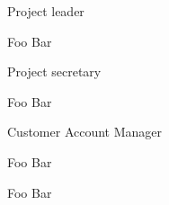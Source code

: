 \begin{itemize*}
	\item Project leader
	\begin{itemize*}
		\item Foo Bar
	\end{itemize*}

	\item Project secretary
	\begin{itemize*}
		\item Foo Bar
	\end{itemize*}
	
	\item Customer Account Manager
	\begin{itemize*}
		\item Foo Bar
		\item Foo Bar
	\end{itemize*}
\end{itemize*}
